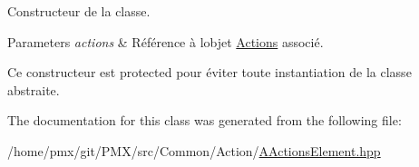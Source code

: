 Constructeur de la classe. 


\begin{DoxyParams}{Parameters}
{\em actions} & Référence à l\textquotesingle{}objet \hyperlink{classActions}{Actions} associé.\\
\hline
\end{DoxyParams}
Ce constructeur est {\ttfamily protected} pour éviter toute instantiation de la classe abstraite. 

The documentation for this class was generated from the following file\+:\begin{DoxyCompactItemize}
\item 
/home/pmx/git/\+P\+M\+X/src/\+Common/\+Action/\hyperlink{AActionsElement_8hpp}{A\+Actions\+Element.\+hpp}\end{DoxyCompactItemize}
